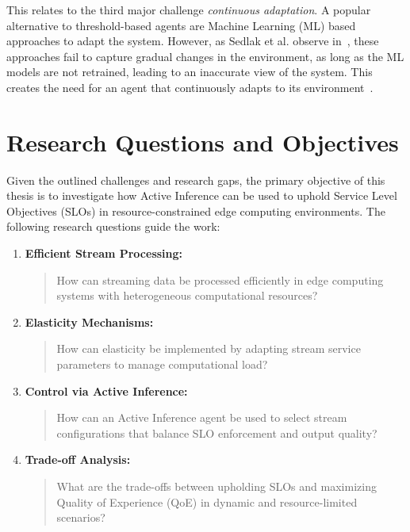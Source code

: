 This relates to the third major challenge \textit{continuous adaptation}\cite{danilenka_adaptive_2025}. A popular alternative to threshold-based agents are Machine Learning (ML) based approaches to adapt the system. However, as Sedlak et al. observe in~\cite{sedlak_active_2024}, these approaches fail to capture gradual changes in the environment, as long as the ML models are not retrained, leading to an inaccurate view of the system. This creates the need for an agent that continuously adapts to its environment~\cite{sedlak_equilibrium_2024}.


\section{Research Questions and Objectives}
\label{sec:research-question}

Given the outlined challenges and research gaps, the primary objective of this thesis is to investigate how Active Inference can be used to uphold Service Level Objectives (SLOs) in resource-constrained edge computing environments. The following research questions guide the work:

\begin{enumerate}
    \item \textbf{Efficient Stream Processing:} 
    \begin{quote}
        How can streaming data be processed efficiently in edge computing systems with heterogeneous computational resources?
    \end{quote}
    
    \item \textbf{Elasticity Mechanisms:}
    \begin{quote}
        How can elasticity be implemented by adapting stream service parameters to manage computational load?
    \end{quote}
    
    \item \textbf{Control via Active Inference:}
    \begin{quote}
        How can an Active Inference agent be used to select stream configurations that balance SLO enforcement and output quality?
    \end{quote}
    
    \item \textbf{Trade-off Analysis:}
    \begin{quote}
        What are the trade-offs between upholding SLOs and maximizing Quality of Experience (QoE) in dynamic and resource-limited scenarios?
    \end{quote}
\end{enumerate}

